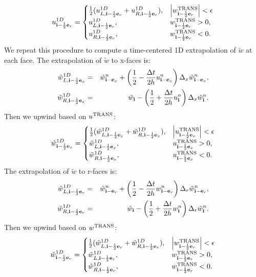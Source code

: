\documentclass[11pt]{article}
\def\half  {\frac{1}{2}}
\def\dt    {\Delta t}
\def\trans {\rm TRANS}
\def\eb    {{\bf e}}
\def\ib    {{\bf i}}
\def\wt    {\tilde{w}}
\begin{document}
\begin{equation}
u_{\ib-\half\eb_r}^{1D} =
\begin{cases}
\half(u_{L,\ib-\half\eb_r}^{1D} + u_{R,\ib-\half\eb_r}^{1D}), & \left|w^{\trans}_{\ib-\half\eb_r}\right| < \epsilon \\
u_{L,\ib-\half\eb_r}^{1D}, & w^{\trans}_{\ib-\half\eb_r} > 0, \\
u_{R,\ib-\half\eb_r}^{1D}, & w^{\trans}_{\ib-\half\eb_r} < 0. \\
\end{cases}
\end{equation}
We repeat this procedure to compute a time-centered 1D extrapolation of $\wt$ at each face.  The extrapolation of $\wt$ to x-faces is:
\begin{eqnarray}
\wt_{L,\ib-\half\eb_x}^{1D} &=& \wt_{\ib-\eb_x}^n + \left(\half - \frac{\dt}{2h}u_{\ib-\eb_x}^n\right)\Delta_x \wt_{\ib-\eb_x}^n, \\
\wt_{R,\ib-\half\eb_x}^{1D} &=& \wt_{\ib} - \left(\half + \frac{\dt}{2h}u_{\ib}^n\right)\Delta_x \wt_{\ib}^n.
\end{eqnarray}
Then we upwind based on $u^{\trans}$:
\begin{equation}
\wt_{\ib-\half\eb_x}^{1D} =
\begin{cases}
\half(\wt_{L,\ib-\half\eb_x}^{1D} + \wt_{R,\ib-\half\eb_x}^{1D}), & \left|u^{\trans}_{\ib-\half\eb_x}\right| < \epsilon \\
\wt_{L,\ib-\half\eb_x}^{1D}, & u^{\trans}_{\ib-\half\eb_x} > 0, \\
\wt_{R,\ib-\half\eb_x}^{1D}, & u^{\trans}_{\ib-\half\eb_x} < 0. \\
\end{cases}
\end{equation}
The extrapolation of $\wt$ to r-faces is:
\begin{eqnarray}
\wt_{L,\ib-\half\eb_r}^{1D} &=& \wt_{\ib-\eb_r}^n + \left(\half - \frac{\dt}{2h}w_{\ib-\eb_r}^n\right)\Delta_r \wt_{\ib-\eb_r}^n, \label{1D wt_L extrap} \\
\wt_{R,\ib-\half\eb_r}^{1D} &=& \wt_{\ib} - \left(\half + \frac{\dt}{2h}w_{\ib}^n\right)\Delta_r \wt_{\ib}^n. \label{1D wt_R extrap}
\end{eqnarray}
Then we upwind based on $w^{\trans}$:
\begin{equation}
\wt_{\ib-\half\eb_r}^{1D} =
\begin{cases}
\half(\wt_{L,\ib-\half\eb_r}^{1D} + \wt_{R,\ib-\half\eb_r}^{1D}), & \left|w^{\trans}_{\ib-\half\eb_r}\right| < \epsilon \\
\wt_{L,\ib-\half\eb_r}^{1D}, & w^{\trans}_{\ib-\half\eb_r} > 0, \\
\wt_{R,\ib-\half\eb_r}^{1D}, & w^{\trans}_{\ib-\half\eb_r} < 0. \\
\end{cases}
\end{equation}
\end{document}
